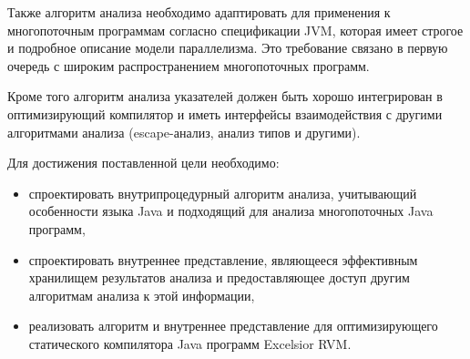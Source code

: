 \documentclass[14pt,titlepage]{extarticle}
\newcommand{\eng}[1]{{\English#1}}
\begin{document}
    Также алгоритм анализа необходимо адаптировать для применения к
    многопоточным программам согласно спецификации JVM, которая имеет
    строгое и подробное описание модели параллелизма. Это требование
    связано в первую очередь с широким распространением многопоточных программ.

    Кроме того алгоритм анализа указателей должен быть хорошо интегрирован в
    оптимизирующий компилятор и иметь интерфейсы взаимодействия с другими
    алгоритмами анализа (escape-анализ, анализ типов и другими).

    Для достижения поставленной цели необходимо:
    \begin{itemize}
      \item спроектировать внутрипроцедурный алгоритм анализа, учитывающий
            особенности языка Java и подходящий для анализа
            многопоточных Java программ,
      \item спроектировать внутреннее представление, являющееся эффективным
            хранилищем результатов анализа и предоставляющее доступ
            другим алгоритмам анализа к этой информации,
      \item реализовать алгоритм и внутреннее представление для оптимизирующего
            статического компилятора Java программ \eng{Excelsior RVM}.
    \end{itemize}

  \newpage
  
\end{document}

